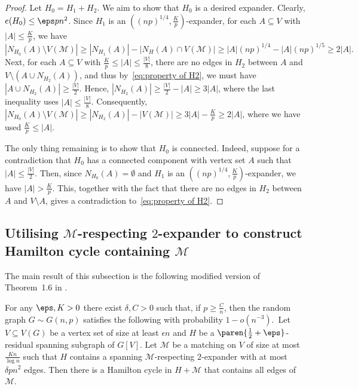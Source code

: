 \documentclass[10pt,a4paper,reqno]{amsart}
\begin{document}
\begin{proof}
Let $H_0 = H_1 + H_2$. We aim to show that $H_0$ is a desired expander. Clearly, $e(H_0)\le \eps pn^2$. Since $H_1$ is an $\left((np)^{1/4}, \frac{K}{p}\right)$-expander, for each $A\subseteq V$ with $|A|\le \frac{K}{p}$, we have 
\[
|N_{H_0}(A)\setminus V(\mathcal{M})|\ge |N_{H_1}(A)| - |N_{H}(A)\cap V(\mathcal{M})|\ge |A|(np)^{1/4} - |A|(np)^{1/5} \ge 2|A|.
\]
Next, for each $A\subseteq V$ with $\frac{K}{p} \le |A|\le \frac{|V|}{8}$, there are no edges in $H_2$ between $A$ and $V\setminus (A\cup N_{H_2}(A))$, and thus by~\eqref{eq:property of H2}, we must have $|A\cup N_{H_2}(A)|\ge \frac{|V|}{2}$. Hence, $|N_{H_2}(A)|\ge \frac{|V|}{2} - |A|\ge 3|A|$, where the last inequality uses $|A|\le \frac{|V|}{8}$. Consequently, $|N_{H_0}(A)\setminus V(\mathcal{M})|\ge |N_{H_2}(A)| - |V(\mathcal{M})|\ge 3|A| - \frac{K}{p}\ge 2|A|$, where we have used $\frac{K}{p} \le |A|$. 

The only thing remaining is to show that $H_0$ is connected. Indeed, suppose for a contradiction that $H_0$ has a connected component with vertex set $A$ such that $|A|\le \frac{|V|}{2}$. Then, since $N_{H_0}(A) = \emptyset$ and $H_1$ is an $\left((np)^{1/4}, \frac{K}{p} \right)$-expander, we have $|A|> \frac{K}{p}$. This, together with the fact that there are no edges in $H_2$ between $A$ and $V\setminus A$, gives a contradiction to~\eqref{eq:property of H2}.
\end{proof}


\subsection{\texorpdfstring{Utilising $\mathcal{M}$-respecting $2$-expander to construct Hamilton cycle containing $\mathcal{M}$}{Utilising M-respecting 2-expander to construct Hamilton cycle containing M}}
\label{sec:join_paths_to_cycle}

The main result of this subsection is the following modified version of Theorem~1.6 in \cite{Montgomery2019resilient}.
\begin{theorem}
  \label{thm:join_paths_to_cycle_main}
  For any $\eps, K >0$ there exist $\delta, C > 0$ such that, if $p \geq \frac{C}{n}$, then the random graph $G \sim G(n,p)$ satisfies the following with probability $1 - o(n^{-3})$.\ Let $V \subseteq V(G)$ be a vertex set of size at least $\epsilon n$ and $H$ be a $\paren{\frac{1}{2} + \eps}$-residual spanning subgraph of $G[V]$. Let $\mathcal{M}$ be a matching on $V$ of size at most $\frac{K n}{\log{n}}$ such that $H$ contains a spanning $\mathcal{M}$-respecting $2$-expander with at most $\delta p n^2$ edges. Then there is a Hamilton cycle in $H + \mathcal{M}$ that contains all edges of $\mathcal{M}$.
\end{theorem}
\end{document}
